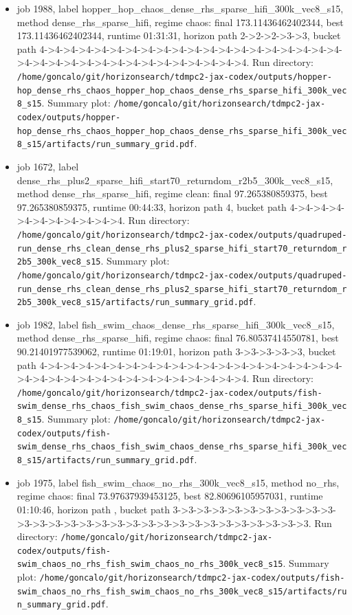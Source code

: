 \begin{itemize}
\item job 1988, label hopper\_hop\_chaos\_dense\_rhs\_sparse\_hifi\_300k\_vec8\_s15, method dense\_rhs\_sparse\_hifi, regime chaos: final 173.11436462402344, best 173.11436462402344, runtime 01:31:31, horizon path 2->2->2->3->3, bucket path 4->4->4->4->4->4->4->4->4->4->4->4->4->4->4->4->4->4->4->4->4->4->4->4->4->4->4->4->4->4->4->4->4->4->4. Run directory: \texttt{/home/goncalo/git/horizonsearch/tdmpc2-jax-codex/outputs/hopper-hop\_dense\_rhs\_chaos\_hopper\_hop\_chaos\_dense\_rhs\_sparse\_hifi\_300k\_vec8\_s15}. Summary plot: \texttt{/home/goncalo/git/horizonsearch/tdmpc2-jax-codex/outputs/hopper-hop\_dense\_rhs\_chaos\_hopper\_hop\_chaos\_dense\_rhs\_sparse\_hifi\_300k\_vec8\_s15/artifacts/run\_summary\_grid.pdf}.
\item job 1672, label dense\_rhs\_plus2\_sparse\_hifi\_start70\_returndom\_r2b5\_300k\_vec8\_s15, method dense\_rhs\_sparse\_hifi, regime clean: final 97.265380859375, best 97.265380859375, runtime 00:44:33, horizon path 4, bucket path 4->4->4->4->4->4->4->4->4->4->4. Run directory: \texttt{/home/goncalo/git/horizonsearch/tdmpc2-jax-codex/outputs/quadruped-run\_dense\_rhs\_clean\_dense\_rhs\_plus2\_sparse\_hifi\_start70\_returndom\_r2b5\_300k\_vec8\_s15}. Summary plot: \texttt{/home/goncalo/git/horizonsearch/tdmpc2-jax-codex/outputs/quadruped-run\_dense\_rhs\_clean\_dense\_rhs\_plus2\_sparse\_hifi\_start70\_returndom\_r2b5\_300k\_vec8\_s15/artifacts/run\_summary\_grid.pdf}.
\item job 1982, label fish\_swim\_chaos\_dense\_rhs\_sparse\_hifi\_300k\_vec8\_s15, method dense\_rhs\_sparse\_hifi, regime chaos: final 76.80537414550781, best 90.21401977539062, runtime 01:19:01, horizon path 3->3->3->3->3, bucket path 4->4->4->4->4->4->4->4->4->4->4->4->4->4->4->4->4->4->4->4->4->4->4->4->4->4->4->4->4->4->4->4->4->4->4. Run directory: \texttt{/home/goncalo/git/horizonsearch/tdmpc2-jax-codex/outputs/fish-swim\_dense\_rhs\_chaos\_fish\_swim\_chaos\_dense\_rhs\_sparse\_hifi\_300k\_vec8\_s15}. Summary plot: \texttt{/home/goncalo/git/horizonsearch/tdmpc2-jax-codex/outputs/fish-swim\_dense\_rhs\_chaos\_fish\_swim\_chaos\_dense\_rhs\_sparse\_hifi\_300k\_vec8\_s15/artifacts/run\_summary\_grid.pdf}.
\item job 1975, label fish\_swim\_chaos\_no\_rhs\_300k\_vec8\_s15, method no\_rhs, regime chaos: final 73.97637939453125, best 82.80696105957031, runtime 01:10:46, horizon path , bucket path 3->3->3->3->3->3->3->3->3->3->3->3->3->3->3->3->3->3->3->3->3->3->3->3->3->3->3->3->3->3. Run directory: \texttt{/home/goncalo/git/horizonsearch/tdmpc2-jax-codex/outputs/fish-swim\_chaos\_no\_rhs\_fish\_swim\_chaos\_no\_rhs\_300k\_vec8\_s15}. Summary plot: \texttt{/home/goncalo/git/horizonsearch/tdmpc2-jax-codex/outputs/fish-swim\_chaos\_no\_rhs\_fish\_swim\_chaos\_no\_rhs\_300k\_vec8\_s15/artifacts/run\_summary\_grid.pdf}.

\end{itemize}
